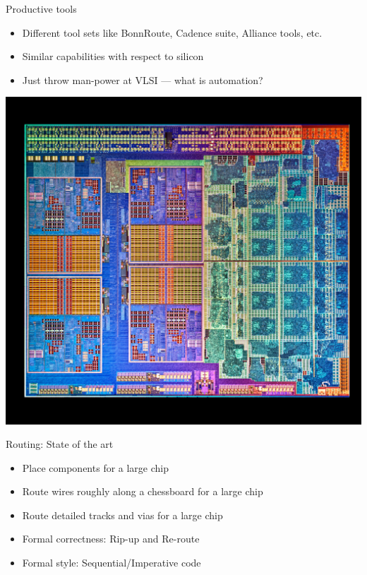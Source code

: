 \documentclass[aspectratio=169]{beamer}
\begin{document}
\begin{frame}{Productive tools}
	\begin{itemize}
        \setlength\itemsep{1em}
		\item Different tool sets like BonnRoute, Cadence suite, Alliance tools, etc.
		\item Similar capabilities with respect to silicon
		\item Just throw man-power at VLSI --- what is automation?
	\end{itemize}
\end{frame}

{
\begin{frame}
    \begin{center}
        \includegraphics[height=\textheight]{images/VLSI01_rotated.jpg}
    \end{center}
\end{frame} 
}

\begin{frame}{Routing: State of the art}
	\begin{itemize}
        \setlength\itemsep{1em}
		\item Place components for a large chip
		\item Route wires roughly along a chessboard for a large chip
		\item Route detailed tracks and vias for a large chip
		\item Formal correctness: Rip-up and Re-route
		\item Formal style: Sequential/Imperative code
	\end{itemize}
\end{frame}
\end{document}
